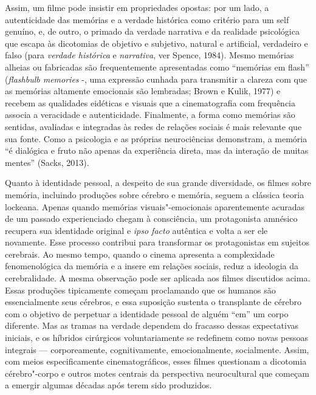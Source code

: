 Assim, um filme pode insistir em propriedades opostas: por um lado, a
autenticidade das memórias e a verdade histórica como critério para um
self genuíno, e, de outro, o primado da verdade narrativa e da realidade
psicológica que escapa às dicotomias de objetivo e subjetivo, natural e
artificial, verdadeiro e falso (para \emph{verdade histórica} e
\emph{narrativa}, ver Spence, 1984). Mesmo memórias alheias ou
fabricadas são frequentemente apresentadas como ``memórias em flash''
(\emph{flashbulb memories} -, uma expressão cunhada para transmitir a
clareza com que as memórias altamente emocionais são lembradas; Brown e
Kulik, 1977) e recebem as qualidades eidéticas e visuais que a
cinematografia com frequência associa a veracidade e autenticidade.
Finalmente, a forma como memórias são sentidas, avaliadas e integradas
às redes de relações sociais é mais relevante que sua fonte. Como a
psicologia e as próprias neurociências demonstram, a memória ``é
dialógica e fruto não apenas da experiência direta, mas da interação de
muitas mentes'' (Sacks, 2013).

Quanto à identidade pessoal, a despeito de sua grande diversidade, os
filmes sobre memória, incluindo produções sobre cérebro e memória,
seguem a clássica teoria lockeana. Apenas quando memórias
visuais"-emocionais aparentemente acuradas de um passado experienciado
chegam à consciência, um protagonista amnésico recupera sua identidade
original e \emph{ipso facto} autêntica e volta a ser ele novamente. Esse
processo contribui para transformar os protagonistas em sujeitos
cerebrais. Ao mesmo tempo, quando o cinema apresenta a complexidade
fenomenológica da memória e a insere em relações sociais, reduz a
ideologia da cerebralidade. A mesma observação pode ser aplicada aos
filmes discutidos acima. Essas produções tipicamente começam proclamando
que os humanos são essencialmente seus cérebros, e essa suposição
sustenta o transplante de cérebro com o objetivo de perpetuar a
identidade pessoal de alguém ``em'' um corpo diferente. Mas as tramas na
verdade dependem do fracasso dessas expectativas iniciais, e os híbridos
cirúrgicos voluntariamente se redefinem como novas pessoas integrais ---
corporeamente, cognitivamente, emocionalmente, socialmente. Assim, com
meios especificamente cinematográficos, esses filmes questionam a
dicotomia cérebro"-corpo e outros motes centrais da perspectiva
neurocultural que começam a emergir algumas décadas após terem sido
produzidos.

